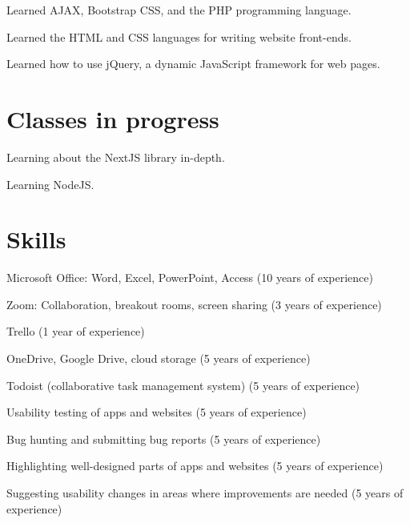 \documentclass[]{deedy-resume-openfont}
\begin{document}
Learned AJAX, Bootstrap CSS, and the PHP programming language.
\sectionsep

Learned the HTML and CSS languages for writing website front-ends.
\sectionsep

Learned how to use jQuery, a dynamic JavaScript framework for web pages.
\sectionsep

\section{Classes in progress}
Learning about the NextJS library in-depth.
\sectionsep

Learning NodeJS.
\sectionsep

\section{Skills}
\descript{}
\begin{tightemize}
\item Microsoft Office: Word\footnotemark, Excel\footnotemark[\value{footnote}], PowerPoint, Access (10 years of experience)
\item Zoom: Collaboration, breakout rooms, screen sharing (3 years of experience)
\item Trello (1 year of experience)
\item OneDrive, Google Drive, cloud storage (5 years of experience)
\item Todoist (collaborative task management system) (5 years of experience)
\end{tightemize}
\sectionsep

\descript{}
\begin{tightemize}
\item Usability testing of apps and websites (5 years of experience)
\item Bug hunting and submitting bug reports (5 years of experience)
\item Highlighting well-designed parts of apps and websites (5 years of experience)
\item Suggesting usability changes in areas where improvements are needed (5 years of experience)
\end{tightemize}
\sectionsep
\end{document}
